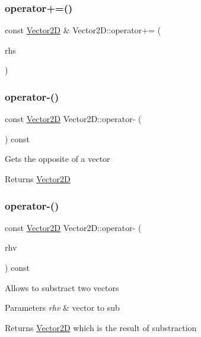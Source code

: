 \subsubsection{\texorpdfstring{operator+=()}{operator+=()}}
{\footnotesize\ttfamily const \hyperlink{class_vector2_d}{Vector2D} \& Vector2\+D\+::operator+= (\begin{DoxyParamCaption}\item[{const \hyperlink{class_vector2_d}{Vector2D} \&}]{rhs }\end{DoxyParamCaption})}

\hypertarget{class_vector2_d_a03bb71dddee9f2d265410b932711b9a4}{}\label{class_vector2_d_a03bb71dddee9f2d265410b932711b9a4} 
\subsubsection{\texorpdfstring{operator-\/()}{operator-()}\hspace{0.1cm}{\footnotesize\ttfamily [1/2]}}
{\footnotesize\ttfamily const \hyperlink{class_vector2_d}{Vector2D} Vector2\+D\+::operator-\/ (\begin{DoxyParamCaption}{ }\end{DoxyParamCaption}) const}

Gets the opposite of a vector \begin{DoxyReturn}{Returns}
\hyperlink{class_vector2_d}{Vector2D} 
\end{DoxyReturn}
\hypertarget{class_vector2_d_a107f6955e56db7e2f0f8e86e6a4a4be2}{}\label{class_vector2_d_a107f6955e56db7e2f0f8e86e6a4a4be2} 
\subsubsection{\texorpdfstring{operator-\/()}{operator-()}\hspace{0.1cm}{\footnotesize\ttfamily [2/2]}}
{\footnotesize\ttfamily const \hyperlink{class_vector2_d}{Vector2D} Vector2\+D\+::operator-\/ (\begin{DoxyParamCaption}\item[{const \hyperlink{class_vector2_d}{Vector2D} \&}]{rhv }\end{DoxyParamCaption}) const}

Allows to substract two vectors 
\begin{DoxyParams}{Parameters}
{\em rhv} & vector to sub \\
\hline
\end{DoxyParams}
\begin{DoxyReturn}{Returns}
\hyperlink{class_vector2_d}{Vector2D} which is the result of substraction 
\end{DoxyReturn}
\hypertarget{class_vector2_d_a39e1e309b40f2b3df02d26911e4637cc}{}\label{class_vector2_d_a39e1e309b40f2b3df02d26911e4637cc} 
